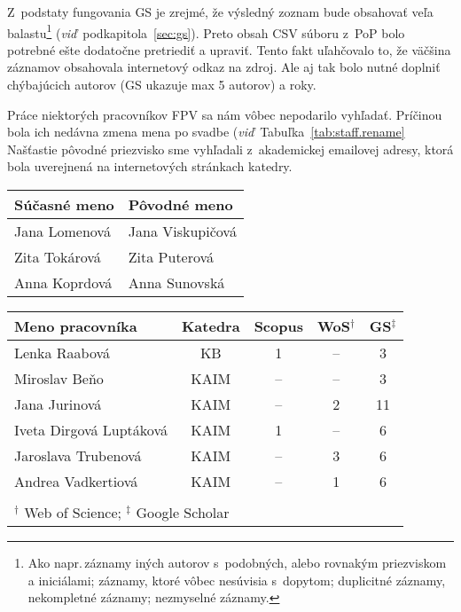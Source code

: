 Z~podstaty fungovania GS je zrejmé, že výsledný zoznam bude obsahovať veľa
balastu\footnote{Ako napr.\,záznamy iných autorov s~podobných, alebo rovnakým
  priezviskom a iniciálami; záznamy, ktoré vôbec nesúvisia s~dopytom; duplicitné
  záznamy, nekompletné záznamy; nezmyselné záznamy.}
(\emph{viď}~podkapitola~\ref{sec:gs}).  Preto obsah CSV súboru z~PoP bolo
potrebné ešte dodatočne pretriediť a upraviť.  Tento fakt uľahčovalo to, že
väčšina záznamov obsahovala internetový odkaz na zdroj.  Ale aj tak bolo nutné
doplniť chýbajúcich autorov (GS ukazuje max 5 autorov) a roky.

Práce niektorých pracovníkov FPV sa nám vôbec nepodarilo vyhľadať.  Príčinou
bola ich nedávna zmena mena po svadbe (\emph{viď}~Tabuľka~\ref{tab:staff.rename}
Našťastie pôvodné priezvisko sme vyhľadali z~akademickej emailovej adresy, ktorá
bola uverejnená na internetových stránkach katedry.

\begin{SCtable}
  \centering\small
  \caption[Mená pracovníkov FPV, u~ktorých došlo k~zmene priezviska]%
  {Zoznam pracovníkov FPV, u~ktorých došlo k~zmene priezviska.  Pôvodné
    priezvisko sme vyhľadali z~akademickej emailovej adresy.}
  \label{tab:staff.rename}
  \begin{tabular}{ll}
    \toprule
    Súčasné meno & Pôvodné meno \\
    \midrule
    Jana Lomenová & Jana Viskupičová \\
    Zita Tokárová & Zita Puterová    \\
    Anna Koprdová & Anna Sunovská    \\
    \bottomrule
  \end{tabular}
\end{SCtable}

\begin{SCtable}
  \centering\small
  \caption[Mená pracovníkov FPV, u~ktorých sa nám nepodarilo získať všetky dáta]%
  {Zoznam Pracovníkov FPV, pre ktorých sa nepodarilo získať z~niektorých
    citačných registrov žiadne dáta.  V~posledných troch stĺpcoch je uvedený
    počet publikácií, ktoré sa nám podarilo získať.}
  \label{tab:staff.missing}
  \begin{tabular}{lcccc}
    \toprule
    Meno pracovníka & Katedra & Scopus & WoS$^\dagger$ & GS$^\ddagger$ \\
    \midrule
    Lenka Raabová           &  KB  & 1  & --  & 3  \\
    Miroslav Beňo           & KAIM & -- & --  & 3  \\
    Jana Jurinová           & KAIM & -- & 2   & 11 \\
    Iveta Dirgová Luptáková & KAIM & 1  & --  & 6  \\
    Jaroslava Trubenová     & KAIM & -- & 3   & 6  \\
    Andrea Vadkertiová      & KAIM & -- & 1   & 6  \\
    \bottomrule \\[-2ex]
    \multicolumn{5}{l}{\footnotesize $^\dagger$ Web of Science; $^\ddagger$ Google Scholar}
  \end{tabular}
\end{SCtable}


